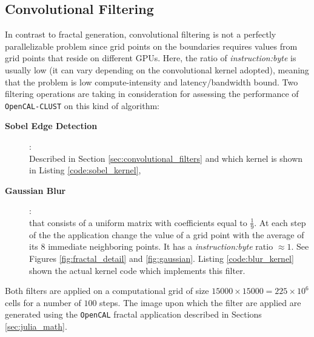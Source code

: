 \subsection{Convolutional Filtering}
\label{sec:sobel_performance}
In contrast to fractal generation, convolutional filtering is not a perfectly parallelizable problem since grid points on the boundaries requires values from grid points that reside on different GPUs. Here, the ratio of \textit{instruction:byte} is usually low (it can vary depending on the convolutional kernel adopted), meaning that the problem is low compute-intensity and latency/bandwidth bound.
Two filtering operations are taking in consideration for assessing the performance of \texttt{OpenCAL-CLUST}  on this kind of algorithm:
\begin{description}
    \item[\textbf{Sobel Edge Detection}]:\\ Described in Section \ref{sec:convolutional_filters} and which kernel is shown in Listing \ref{code:sobel_kernel},
    \item[\textbf{Gaussian Blur}]:\\ that consists of a  uniform matrix  with coefficients equal to $\frac{1}{9}$. At each step of the the application change the value of a grid point with the average of its $8$ immediate neighboring points. It has a \textit{instruction:byte} ratio $\approx 1$. See Figures \ref{fig:fractal_detail} and \ref{fig:gaussian}. Listing \ref{code:blur_kernel} shown the actual kernel code which implements this filter.
\end{description}
Both filters are applied on a computational grid of size $15000 \times 15000=225 \times10^6$ cells for a number of $100$ steps. The image upon which the filter are applied are generated using the \texttt{OpenCAL} fractal application described in Sections \ref{sec:julia_math}.

